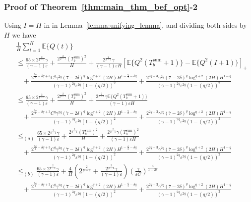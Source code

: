 \documentclass[12pt,draftcls, onecolumn]{IEEEtran}
\begin{document}
\subsubsection{Proof of Theorem~\ref{thm:main_thm_bef_opt}-2}\label{sec:main_thm_2}
Using $I = H$ in in Lemma~\ref{lemma:unifying_lemma}, and dividing both sides by $H$ we have
\begin{align}
      &\frac{1}{H}\sum_{t=1}^{H} \mathbb{E}\{Q(t)\}  \nonumber\\&\leq  \frac{65\times 2^{\frac{2}{p-1}}\gamma}{(\gamma-1) \varepsilon}+\frac{2^{\frac{2}{p-1}}(T_b^{\text{sum}})^2}{H}+\frac{2^{\frac{2}{p-1}}\gamma}{(\gamma-1)\varepsilon H}\left[\mathbb{E}\{Q^2(T^{\text{sum}}_b+1)\}-\mathbb{E}\{Q^2( I+1)\}\right]_+\nonumber\\&\ \ \ \  +\frac{2^{\frac{5q}{2}-\delta q+3}C^q\gamma^{2q}(7-2\delta)^q \log^{q+2}(2H)H^{1-\frac{q}{2}-\delta q}}{(\gamma-1)^{2q}\varepsilon^{2q}(1-(q/2))^2} +\frac{2^{2q+3}\gamma^{2q}(7-2\delta)^q \log^{q+2}(2H)H^{1-q}}{(\gamma-1)^{2q}\varepsilon^{2q}(1-(q/2))^2} \nonumber\\& \leq  \frac{65\times 2^{\frac{2}{p-1}}\gamma}{(\gamma-1) \varepsilon}+\frac{2^{\frac{2}{p-1}}(T_b^{\text{sum}})^2}{H}+\frac{2^{\frac{2}{p-1}}\gamma\mathbb{E}\{Q^2(T^{\text{sum}}_b+1)\}}{(\gamma-1)\varepsilon H}\nonumber\\&\ \ \ \  +\frac{2^{\frac{5q}{2}-\delta q+3}C^q\gamma^{2q}(7-2\delta)^q \log^{q+2}(2H)H^{1-\frac{q}{2}-\delta q}}{(\gamma-1)^{2q}\varepsilon^{2q}(1-(q/2))^2} +\frac{2^{2q+3}\gamma^{2q}(7-2\delta)^q \log^{q+2}(2H)H^{1-q}}{(\gamma-1)^{2q}\varepsilon^{2q}(1-(q/2))^2}\nonumber\\& \leq_{(a)}  \frac{65\times 2^{\frac{2}{p-1}}\gamma}{(\gamma-1) \varepsilon}+\frac{2^{\frac{2}{p-1}}(T_b^{\text{sum}})^2}{H}+\frac{2^{\frac{2}{p-1}}\gamma(T^{\text{sum}}_b)^2}{(\gamma-1)\varepsilon H}\nonumber\\&\ \ \ \  +\frac{2^{\frac{5q}{2}-\delta q+3}C^q\gamma^{2q}(7-2\delta)^q \log^{q+2}(2H)H^{1-\frac{q}{2}-\delta q}}{(\gamma-1)^{2q}\varepsilon^{2q}(1-(q/2))^2} +\frac{2^{2q+3}\gamma^{2q}(7-2\delta)^q \log^{q+2}(2H)H^{1-q}}{(\gamma-1)^{2q}\varepsilon^{2q}(1-(q/2))^2}\nonumber\\& \leq_{(b)}  \frac{65\times 2^{\frac{2}{p-1}}\gamma}{(\gamma-1) \varepsilon}+\frac{4}{H}\left(2^{\frac{2}{p-1}}+\frac{2^{\frac{2}{p-1}}\gamma}{(\gamma-1)\varepsilon}\right)\left(\frac{\gamma}{\varepsilon C}\right)^{\frac{4}{1-2\delta}}\nonumber\\&\ \ \ \  +\frac{2^{\frac{5q}{2}-\delta q+3}C^q\gamma^{2q}(7-2\delta)^q \log^{q+2}(2H)H^{1-\frac{q}{2}-\delta q}}{(\gamma-1)^{2q}\varepsilon^{2q}(1-(q/2))^2} +\frac{2^{2q+3}\gamma^{2q}(7-2\delta)^q \log^{q+2}(2H)H^{1-q}}{(\gamma-1)^{2q}\varepsilon^{2q}(1-(q/2))^2}\nonumber
\end{align}
\end{document}
